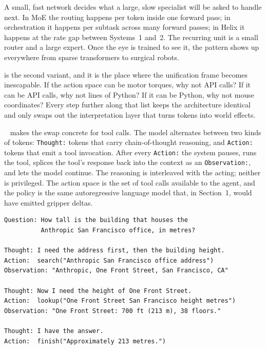 
 A small, fast network decides what a large, slow specialist will be asked to handle next. In MoE the routing happens per token inside one forward pass; in orchestration it happens per subtask across many forward passes; in Helix it happens at the rate gap between Systems~1 and~2. The recurring unit is a small router and a large expert. Once the eye is trained to see it, the pattern shows up everywhere from sparse transformers to surgical robots.

\vspace{2.5em}

 is the second variant, and it is the place where the unification frame becomes inescapable. If the action space can be motor torques, why not API calls? If it can be API calls, why not lines of Python? If it can be Python, why not mouse coordinates? Every step further along that list keeps the architecture identical and only swaps out the interpretation layer that turns tokens into world effects.

~\cite{Yao2023ReAct} makes the swap concrete for tool calls. The model alternates between two kinds of tokens: \texttt{Thought:} tokens that carry chain-of-thought reasoning, and \texttt{Action:} tokens that emit a tool invocation. After every \texttt{Action:} the system pauses, runs the tool, splices the tool's response back into the context as an \texttt{Observation:}, and lets the model continue. The reasoning is interleaved with the acting; neither is privileged. The action space is the set of tool calls available to the agent, and the policy is the same autoregressive language model that, in Section~1, would have emitted gripper deltas.

\begin{verbatim}
Question: How tall is the building that houses the
          Anthropic San Francisco office, in metres?

Thought: I need the address first, then the building height.
Action:  search("Anthropic San Francisco office address")
Observation: "Anthropic, One Front Street, San Francisco, CA"

Thought: Now I need the height of One Front Street.
Action:  lookup("One Front Street San Francisco height metres")
Observation: "One Front Street: 700 ft (213 m), 38 floors."

Thought: I have the answer.
Action:  finish("Approximately 213 metres.")
\end{verbatim}

